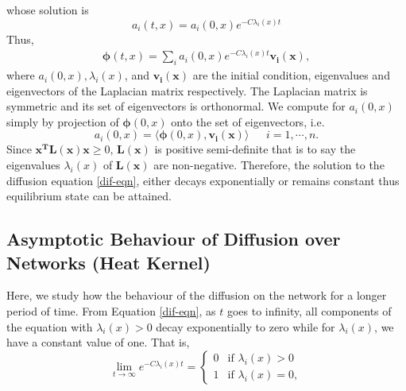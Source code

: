 \documentclass[10pt,a4paper]{article}
\begin{document}
whose solution is\\
\begin{equation}
a_{i}(t,x) = a_{i}(0,x) e^{-C \lambda_{i}(x) t}
\label{eqn:2}
\end{equation}
Thus,
\begin{eqnarray*}
	\boldsymbol{\phi}(t,x) = \sum_i a_i(0,x) e^{-C\lambda_i(x) t} \mathbf{v_i(x)},  %
\end{eqnarray*}
where $a_i(0,x), \lambda_i(x)$, and $\mathbf{v_i(x)}$ are the initial condition, eigenvalues and eigenvectors of the Laplacian matrix respectively. The Laplacian matrix is symmetric and its set of eigenvectors is orthonormal. We compute for $a_i (0,x)$ simply by projection of $\boldsymbol{\phi}(0,x)$ onto the set of eigenvectors, i.e.
\begin{equation}
a_i (0,x)= \langle \boldsymbol{\phi}(0,x),\mathbf{v_i(x)} \rangle \;\; \quad i=1,\cdots,n.
\label{dif-eqn}
\end{equation}
Since $\mathbf{x^T L(x) x} \geq 0$, $\mathbf{L(x)}$ is positive semi-definite that is to say the eigenvalues $\lambda_i(x)$ of $\mathbf{L(x)}$ are non-negative. Therefore, the solution to the diffusion equation \ref{dif-eqn}, either decays exponentially or remains constant thus equilibrium state can be attained. 
\subsection{Asymptotic Behaviour of Diffusion over Networks (Heat Kernel)} 
Here, we study how the behaviour of the diffusion on the network for a longer period of time. From Equation \ref{dif-eqn}, as $t$ goes to infinity, all components of the equation with $\lambda_i(x)>0$ decay exponentially to zero while for $\lambda_i(x)$, we have a constant value of one. That is,
\begin{equation}
\lim_{t \to \infty} e^{-C \lambda_i(x) t} = \begin{cases} 0 &\mbox{if } \lambda_i(x) > 0 \\
1 & \mbox{if } \lambda_i(x) = 0, \end{cases} 
\end{equation}
\end{document}
